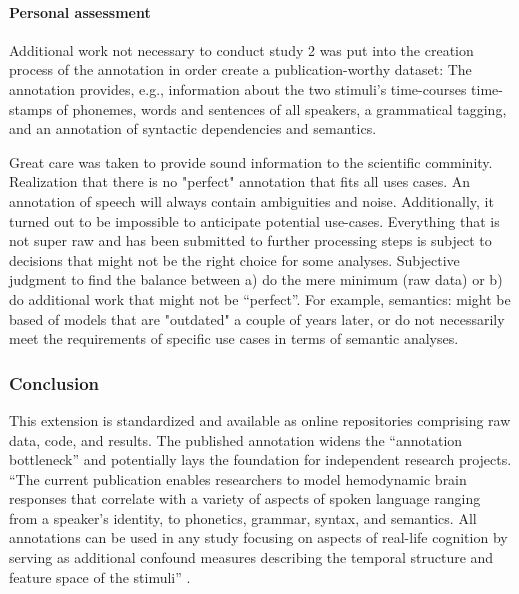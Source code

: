 \paragraph{Personal assessment}


%

%
Additional work not necessary to conduct study 2 was put into the creation
process of the annotation in order create a publication-worthy dataset:
%
The annotation provides, e.g., information about the two stimuli's time-courses
time-stamps of phonemes, words and sentences of all speakers, a grammatical
tagging, and an annotation of syntactic dependencies and semantics.

%
Great care was taken to provide sound information to the scientific comminity.
%
Realization that there is no "perfect" annotation that fits all uses cases.
%
An annotation of speech will always contain ambiguities and noise.
%
Additionally, it turned out to be impossible to anticipate potential use-cases.
%
Everything that is not super raw and has been submitted to further processing
steps is subject to decisions that might not be the right choice for some
analyses.
%
Subjective judgment to find the balance between
%
a) do the mere minimum (raw data) or
%
b) do additional work that might not be ``perfect''.
%
For example, semantics: might be based of models that are "outdated" a couple of
years later, or do not necessarily meet the requirements of specific use cases
in terms of semantic analyses.


\subsubsection{Conclusion}


%
This extension is standardized and available as online repositories comprising
raw data, code, and results.
%
The published annotation widens the ``annotation bottleneck''
\citep{aliko2020naturalistic} and potentially lays the foundation for
independent research projects.
%
``The current publication enables researchers to model hemodynamic brain
responses that correlate with a variety of aspects of spoken language ranging
from a speaker's identity, to phonetics, grammar, syntax, and semantics.
%
All annotations can be used in any study focusing on aspects of real-life
cognition by serving as additional confound measures describing the temporal
structure and feature space of the stimuli'' \citep{haeusler2021speechanno}.



